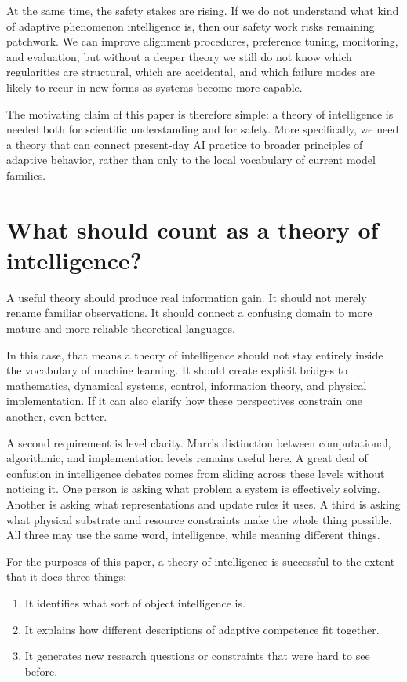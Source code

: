 \documentclass[11pt]{article}
\begin{document}
At the same time, the safety stakes are rising. If we do not understand what kind of adaptive phenomenon intelligence is, then our safety work risks remaining patchwork. We can improve alignment procedures, preference tuning, monitoring, and evaluation, but without a deeper theory we still do not know which regularities are structural, which are accidental, and which failure modes are likely to recur in new forms as systems become more capable.

The motivating claim of this paper is therefore simple: a theory of intelligence is needed both for scientific understanding and for safety. More specifically, we need a theory that can connect present-day AI practice to broader principles of adaptive behavior, rather than only to the local vocabulary of current model families.

\section{What should count as a theory of intelligence?}


A useful theory should produce real information gain. It should not merely rename familiar observations. It should connect a confusing domain to more mature and more reliable theoretical languages.

In this case, that means a theory of intelligence should not stay entirely inside the vocabulary of machine learning. It should create explicit bridges to mathematics, dynamical systems, control, information theory, and physical implementation. If it can also clarify how these perspectives constrain one another, even better.

A second requirement is level clarity. Marr's distinction between computational, algorithmic, and implementation levels remains useful here. A great deal of confusion in intelligence debates comes from sliding across these levels without noticing it. One person is asking what problem a system is effectively solving. Another is asking what representations and update rules it uses. A third is asking what physical substrate and resource constraints make the whole thing possible. All three may use the same word, intelligence, while meaning different things.

For the purposes of this paper, a theory of intelligence is successful to the extent that it does three things:

\begin{enumerate}
\item It identifies what sort of object intelligence is.
\item It explains how different descriptions of adaptive competence fit together.
\item It generates new research questions or constraints that were hard to see before.

\end{enumerate}
\end{document}
